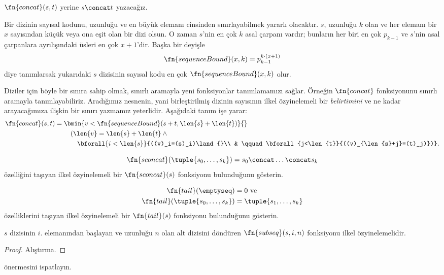 \documentclass[../../../include/open-logic-section]{subfiles}
\begin{document}
$\fn{concat}(s,t)$ yerine $s\concat t$ yazacağız.

Bir dizinin sayısal kodunu, uzunluğu ve en büyük elemanı cinsinden
sınırlayabilmek yararlı olacaktır. $s$, uzunluğu $k$ olan ve her elemanı
bir $x$ sayısından küçük veya ona eşit olan bir dizi olsun. O zaman $s$'nin
en çok $k$ asal çarpanı vardır; bunların her biri en çok $p_{k-1}$ ve
$s$'nin asal çarpanlara ayrılışındaki üsleri en çok $x+1$'dir. Başka bir
deyişle
\[
  \fn{sequenceBound}(x,k)=p_{k-1}^{k\cdot(x+1)}
\]
diye tanımlarsak yukarıdaki $s$ dizisinin sayısal kodu en çok
$\fn{sequenceBound}(x,k)$ olur.

Diziler için böyle bir sınıra sahip olmak, sınırlı aramayla yeni fonksiyonlar
tanımlamamızı sağlar. Örneğin $\fn{concat}$ fonksiyonunu sınırlı aramayla
tanımlayabiliriz. Aradığımız nesnenin, yani birleştirilmiş dizinin sayısının
ilkel özyinelemeli bir \emph{belirtimini} ve ne kadar arayacağımıza ilişkin
bir sınırı yazmamız yeterlidir. Aşağıdaki tanım işe yarar:
\begin{align*}
  \fn{concat}(s,t) = {} & \bmin{v<\fn{sequenceBound}(s+t,\len{s}+\len{t})}{}\\
  & \quad(\len{v}=\len{s}+\len{t}\land{}\\
  & \qquad\bforall{i<\len{s}}{((v)_i=(s)_i)\land{}\\
  & \qquad\bforall{j<\len{t}}{((v)_{\len{s}+j}=(t)_j)})}.
\end{align*}

\begin{prob}
\[
  \fn{sconcat}(\tuple{s_0,\dots,s_k})=s_0\concat\dots\concat s_k
\]
özelliğini taşıyan ilkel özyinelemeli bir $\fn{sconcat}(s)$ fonksiyonu
bulunduğunu gösterin.
\end{prob}

\begin{prob}
\begin{align*}
  \fn{tail}(\emptyseq) & = 0 \text{ ve}\\
  \fn{tail}(\tuple{s_0,\dots,s_k}) & = \tuple{s_1,\dots,s_k}
\end{align*}
özelliklerini taşıyan ilkel özyinelemeli bir $\fn{tail}(s)$ fonksiyonu
bulunduğunu gösterin.
\end{prob}

\begin{prop}
  $s$ dizisinin $i$. elemanından başlayan ve uzunluğu $n$ olan alt dizisini
  döndüren $\fn{subseq}(s,i,n)$ fonksiyonu ilkel özyinelemelidir.
\end{prop}

\begin{proof}
  Alıştırma.
\end{proof}

\begin{prob}
   önermesini ispatlayın.
\end{prob}
\end{document}

